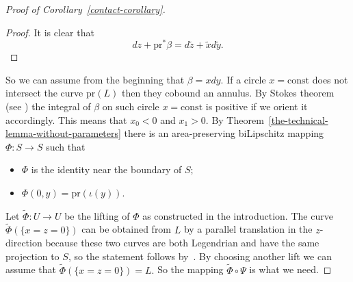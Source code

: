 \documentclass[12pt]{article}
\theoremstyle{definition}
\begin{document}
\begin{proof}[Proof of Corollary~\ref{contact-corollary}]
\begin{proof}
It is clear that
$$
dz + \mathrm{pr}^*\beta = d\widetilde z + \widetilde xd\widetilde y.
$$
\end{proof}

So we can assume from the beginning that $\beta = xdy.$
If a circle $x = \mathrm{const}$ does not intersect the curve $\mathrm{pr}(L)$ then they cobound an annulus. By Stokes theorem (see \cite[Chapter IX, Theorems 5A and 7A]{Whi}) the integral of $\beta$ on such circle $x = \mathrm{const}$ is positive if we orient it accordingly. This means that $x_0<0$ and $x_1>0.$ By Theorem~\ref{the-technical-lemma-without-parameters} there is an area-preserving biLipschitz mapping $\Phi:S\to S$ such that
\begin{itemize}
\item
$\Phi$ is the identity near the boundary of $S$;
\item
$\Phi(0, y) = \mathrm{pr}(\iota(y)).$
\end{itemize}

Let $\widetilde \Phi:U\to U$ be the lifting of $\Phi$ as constructed in the introduction. The curve $\widetilde\Phi(\{x = z = 0\})$ can be obtained from $L$ by a parallel translation in the $z$-direction because these two curves are both Legendrian and have the same projection to $S$, so the statement follows by~\cite[Lemma 3.11]{Pra}. By choosing another lift we can assume that $\widetilde\Phi(\{x = z = 0\}) = L.$ So the mapping $\widetilde\Phi\circ\Psi$ is what we need.
\end{proof}
\end{document}
